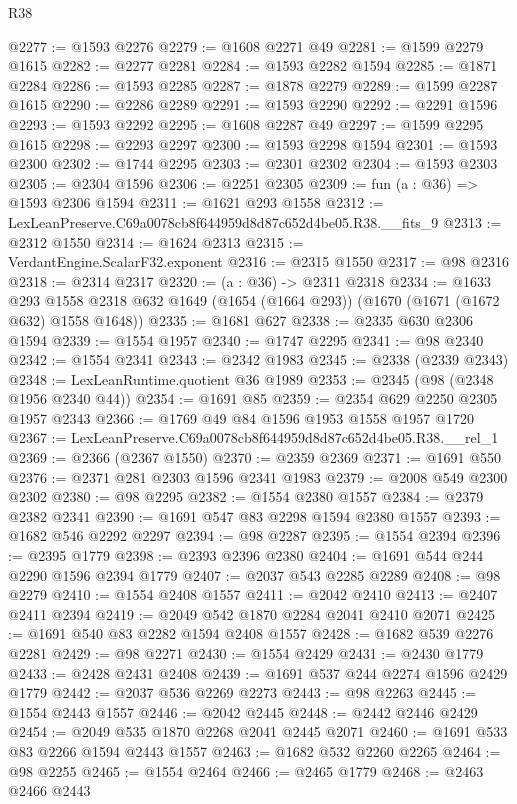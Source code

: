 \begin{lexlean}{R38}
\begin{coremodule}
@2277 := @1593 @2276
@2279 := @1608 @2271 @49
@2281 := @1599 @2279 @1615
@2282 := @2277 @2281
@2284 := @1593 @2282 @1594
@2285 := @1871 @2284
@2286 := @1593 @2285
@2287 := @1878 @2279
@2289 := @1599 @2287 @1615
@2290 := @2286 @2289
@2291 := @1593 @2290
@2292 := @2291 @1596
@2293 := @1593 @2292
@2295 := @1608 @2287 @49
@2297 := @1599 @2295 @1615
@2298 := @2293 @2297
@2300 := @1593 @2298 @1594
@2301 := @1593 @2300
@2302 := @1744 @2295
@2303 := @2301 @2302
@2304 := @1593 @2303
@2305 := @2304 @1596
@2306 := @2251 @2305
@2309 := fun (a : @36) => @1593 @2306 @1594
@2311 := @1621 @293 @1558
@2312 := LexLeanPreserve.C69a0078cb8f644959d8d87c652d4be05.R38.__fits_9
@2313 := @2312 @1550
@2314 := @1624 @2313
@2315 := VerdantEngine.ScalarF32.exponent
@2316 := @2315 @1550
@2317 := @98 @2316
@2318 := @2314 @2317
@2320 := (a : @36) -> @2311 @2318
@2334 := @1633
    @293
    @1558
    @2318
    @632
    @1649
    (@1654 (@1664 @293))
    (@1670 (@1671 (@1672 @632) @1558 @1648))
@2335 := @1681 @627
@2338 := @2335 @630 @2306 @1594
@2339 := @1554 @1957
@2340 := @1747 @2295
@2341 := @98 @2340
@2342 := @1554 @2341
@2343 := @2342 @1983
@2345 := @2338 (@2339 @2343)
@2348 := LexLeanRuntime.quotient @36 @1989
@2353 := @2345 (@98 (@2348 @1956 @2340 @44))
@2354 := @1691 @85
@2359 := @2354 @629 @2250 @2305 @1957 @2343
@2366 := @1769 @49 @84 @1596 @1953 @1558 @1957 @1720
@2367 := LexLeanPreserve.C69a0078cb8f644959d8d87c652d4be05.R38.__rel_1
@2369 := @2366 (@2367 @1550)
@2370 := @2359 @2369
@2371 := @1691 @550
@2376 := @2371 @281 @2303 @1596 @2341 @1983
@2379 := @2008 @549 @2300 @2302
@2380 := @98 @2295
@2382 := @1554 @2380 @1557
@2384 := @2379 @2382 @2341
@2390 := @1691 @547 @83 @2298 @1594 @2380 @1557
@2393 := @1682 @546 @2292 @2297
@2394 := @98 @2287
@2395 := @1554 @2394
@2396 := @2395 @1779
@2398 := @2393 @2396 @2380
@2404 := @1691 @544 @244 @2290 @1596 @2394 @1779
@2407 := @2037 @543 @2285 @2289
@2408 := @98 @2279
@2410 := @1554 @2408 @1557
@2411 := @2042 @2410
@2413 := @2407 @2411 @2394
@2419 := @2049 @542 @1870 @2284 @2041 @2410 @2071
@2425 := @1691 @540 @83 @2282 @1594 @2408 @1557
@2428 := @1682 @539 @2276 @2281
@2429 := @98 @2271
@2430 := @1554 @2429
@2431 := @2430 @1779
@2433 := @2428 @2431 @2408
@2439 := @1691 @537 @244 @2274 @1596 @2429 @1779
@2442 := @2037 @536 @2269 @2273
@2443 := @98 @2263
@2445 := @1554 @2443 @1557
@2446 := @2042 @2445
@2448 := @2442 @2446 @2429
@2454 := @2049 @535 @1870 @2268 @2041 @2445 @2071
@2460 := @1691 @533 @83 @2266 @1594 @2443 @1557
@2463 := @1682 @532 @2260 @2265
@2464 := @98 @2255
@2465 := @1554 @2464
@2466 := @2465 @1779
@2468 := @2463 @2466 @2443

\end{coremodule}
\end{lexlean}
